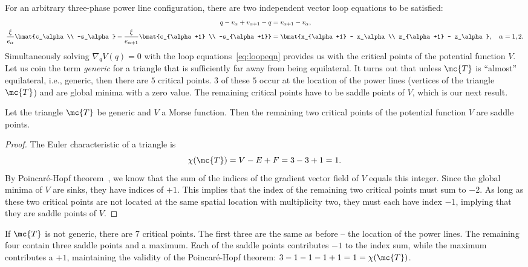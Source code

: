 For an arbitrary three-phase power line configuration, there are two independent
vector loop equations to be satisfied: 
%
\begin{align}
    \begin{split}
        q-v_\alpha + v_{\alpha+1} - q &= v_{\alpha+1} - v_\alpha,  \\
        \frac{\xi}{e_\alpha} \bmat{c_\alpha \\ -s_\alpha} -
        \frac{\xi}{e_{\alpha+1}}\bmat{c_{\alpha+1} \\ -s_{\alpha+1}} &=
        \bmat{x_{\alpha+1} - x_\alpha \\ z_{\alpha+1} - z_\alpha}, \quad \alpha
        = 1, 2.
\end{split}
\label{eq:loopeqn}
\end{align}
%
Simultaneously solving $\nabla_qV(q) = 0$ with the loop
equations~\eqref{eq:loopeqn} provides us with the critical points of the
potential function $V$. Let us coin the term \textit{generic} for a triangle
that is sufficiently far away from being equilateral. It turns out that unless
$\mc{T}$ is ``almost'' equilateral, i.e., generic, then there are $5$ critical
points. $3$ of these $5$ occur at the location of the power lines (vertices of
the triangle $\mc{T}$) and are global minima with a zero value. The remaining
critical points have to be saddle points of $V$, which is our next result.

\begin{lem}
    Let the triangle $\mc{T}$ be generic and $V$ a Morse function. Then the
    remaining two critical points of the potential function $V$ are saddle
    points.
\end{lem}
\begin{proof}
    The Euler characteristic of a triangle is \[ \chi(\mc{T}) = V - E + F = 3 -
    3 + 1 = 1. \] By Poincar\'{e}-Hopf theorem~\cite{burns2005differential}, we
    know that the sum of the indices of the gradient vector field of $V$ equals
    this integer. Since the global minima of $V$ are sinks, they have indices of
    $+1$. This implies that the index of the remaining two critical points must
    sum to $-2$. As long as these two critical points are not located at the
    same spatial location with multiplicity two, they must each have index $-1$,
    implying that they are saddle points of $V$.
\end{proof}

\begin{rem}
    If $\mc{T}$ is not generic, there are $7$ critical points. The first three
    are the same as before -- the location of the power lines. The remaining
    four contain three saddle points and a maximum. Each of the saddle points
    contributes $-1$ to the index sum, while the maximum contributes a $+1$,
    maintaining the validity of the Poincar\'{e}-Hopf theorem: $3 - 1 - 1 - 1 +
    1 = 1 = \chi(\mc{T})$.
\end{rem}

